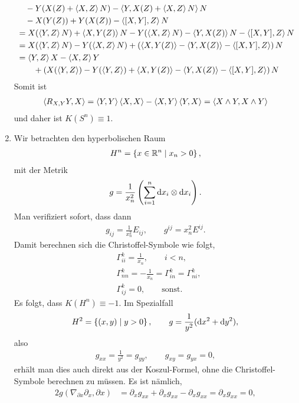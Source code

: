\documentclass[12pt,a4paper]{article}
\def\R{\mathbb{R}}
\begin{document}
\begin{enumerate}
\begin{align*}
&\quad -Y(X(Z) + \left\langle X,Z\right\rangle N) - \left\langle Y,X(Z) + \left\langle X,Z\right\rangle N\right\rangle N\\
&\quad -X(Y(Z)) + Y(X(Z)) - \left\langle[X,Y],Z\right\rangle N\\
&= X(\left\langle Y,Z\right\rangle N) + \left\langle X,Y(Z)\right\rangle N - Y(\left\langle X,Z\right\rangle N) - \left\langle Y,X(Z)\right\rangle N -
\left\langle[X,Y],Z\right\rangle N\\
&=X(\left\langle Y,Z\right\rangle N) - Y(\left\langle X,Z\right\rangle N) + \left(\left\langle X,Y(Z)\right\rangle -
\left\langle Y,X(Z)\right\rangle - \left\langle[X,Y],Z\right\rangle\right)N\\
&= \left\langle Y,Z\right\rangle X  -\left\langle X,Z\right\rangle Y \\ &\qquad+\left(X(\left\langle Y,Z\right\rangle) - 
 Y(\left\langle Y,Z\right\rangle) + \left\langle X,Y(Z)\right\rangle -
\left\langle Y,X(Z)\right\rangle - \left\langle[X,Y],Z\right\rangle\right)N
\end{align*}
Somit ist
\begin{align*}
\left\langle R_{X,Y}Y,X\right\rangle = \left\langle Y,Y\right\rangle\left\langle X,X\right\rangle - \left\langle X,Y\right\rangle\left\langle Y,X\right\rangle = \left\langle X\wedge
Y,X\wedge Y\right\rangle
\end{align*}
und daher ist $K(S^n) \equiv 1$.
\item Wir betrachten den hyperbolischen Raum
\begin{align*}
H^n = \setdef{x\in\R^n}{x_n > 0},
\end{align*}
mit der Metrik
\begin{align*}
g = \frac{1}{x_n^2}\left(\sum_{i=1}^n \mathrm{d}x_i\otimes\mathrm{d}x_i \right).
\end{align*}
Man verifiziert sofort, dass dann
\begin{align*}
g_{ij} = \frac{1}{x_n^2}E_{ij},\qquad g^{ij} = x_n^2 E^{ij}.
\end{align*}
Damit berechnen sich die Christoffel-Symbole wie folgt,
\begin{align*}
&\Gamma_{ii}^k = \frac{1}{x_n},\qquad i < n,\\
&\Gamma_{nn}^k = -\frac{1}{x_n} = \Gamma_{in}^k = \Gamma_{ni}^k,\\
&\Gamma_{ij}^k = 0,\qquad \text{sonst}.
\end{align*}
Es folgt, dass $K(H^n) \equiv -1$. Im Spezialfall
\begin{align*}
H^2 = \left\{(x,y)\;|\; y> 0\right\},\qquad g = \frac{1}{y^2} (\mathrm{d}x^2 + \mathrm{d}y^2),
\end{align*}
also
\begin{align*}
g_{xx} = \frac{1}{y^2} = g_{yy},\qquad g_{xy} = g_{yx} = 0,
\end{align*}
erh\"alt man dies auch direkt aus der Koszul-Formel, ohne die Christoffel-Symbole
berechnen zu m\"ussen. Es ist n\"amlich,
\begin{align*}
2g(\nabla_{\partial x}\partial_x,\partial x) &= \partial_xg_{xx} +
\partial_xg_{xx} - \partial_xg_{xx}
= \partial_x g_{xx} = 0,\\

\end{align*}
\end{enumerate}
\end{document}
